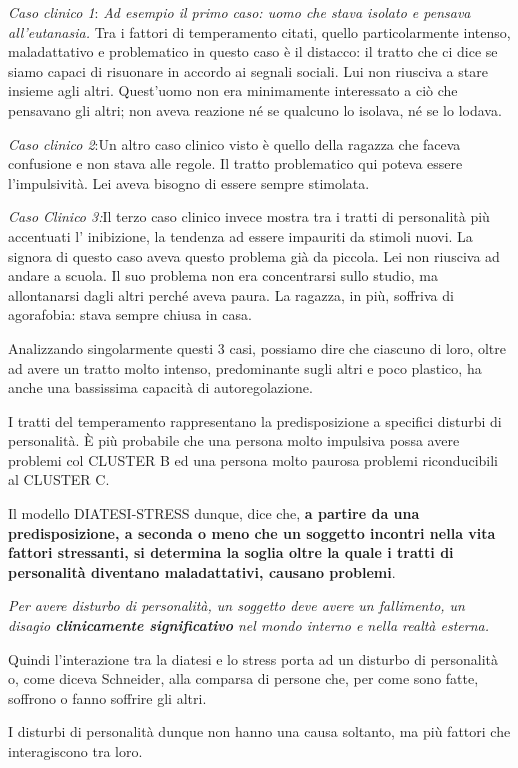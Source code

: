 \emph{Caso clinico 1}: \emph{Ad esempio il primo caso: uomo che stava
isolato e pensava all'eutanasia.} Tra i fattori di temperamento citati,
quello particolarmente intenso, maladattativo e problematico in questo
caso è il distacco: il tratto che ci dice se siamo capaci di risuonare
in accordo ai segnali sociali. Lui non riusciva a stare insieme agli
altri. Quest'uomo non era minimamente interessato a ciò che pensavano
gli altri; non aveva reazione né se qualcuno lo isolava, né se lo
lodava.

\emph{Caso clinico 2}:Un altro caso clinico visto è quello della ragazza
che faceva confusione e non stava alle regole. Il tratto problematico
qui poteva essere l'impulsività. Lei aveva bisogno di essere sempre
stimolata.

\emph{Caso Clinico 3:}Il terzo caso clinico invece mostra tra i tratti
di personalità più accentuati l' inibizione, la tendenza ad essere
impauriti da stimoli nuovi. La signora di questo caso aveva questo
problema già da piccola. Lei non riusciva ad andare a scuola. Il suo
problema non era concentrarsi sullo studio, ma allontanarsi dagli altri
perché aveva paura. La ragazza, in più, soffriva di agorafobia: stava
sempre chiusa in casa.

Analizzando singolarmente questi 3 casi, possiamo dire che ciascuno di
loro, oltre ad avere un tratto molto intenso, predominante sugli altri e
poco plastico, ha anche una bassissima capacità di autoregolazione.

I tratti del temperamento rappresentano la predisposizione a specifici
disturbi di personalità. È più probabile che una persona molto impulsiva
possa avere problemi col CLUSTER B ed una persona molto paurosa problemi
riconducibili al CLUSTER C.

Il modello DIATESI-STRESS dunque, dice che, \textbf{a partire da una
predisposizione, a seconda o meno che un soggetto incontri nella vita
fattori stressanti, si determina la soglia oltre la quale i tratti di
personalità diventano maladattativi, causano problemi}.

\emph{Per avere disturbo di personalità, un soggetto deve avere un
fallimento, un disagio \textbf{clinicamente significativo} nel mondo
interno e nella realtà esterna. }

Quindi l'interazione tra la diatesi e lo stress porta ad un disturbo di
personalità o, come diceva Schneider, alla comparsa di persone che, per
come sono fatte, soffrono o fanno soffrire gli altri.

I disturbi di personalità dunque non hanno una causa soltanto, ma più
fattori che interagiscono tra loro.

